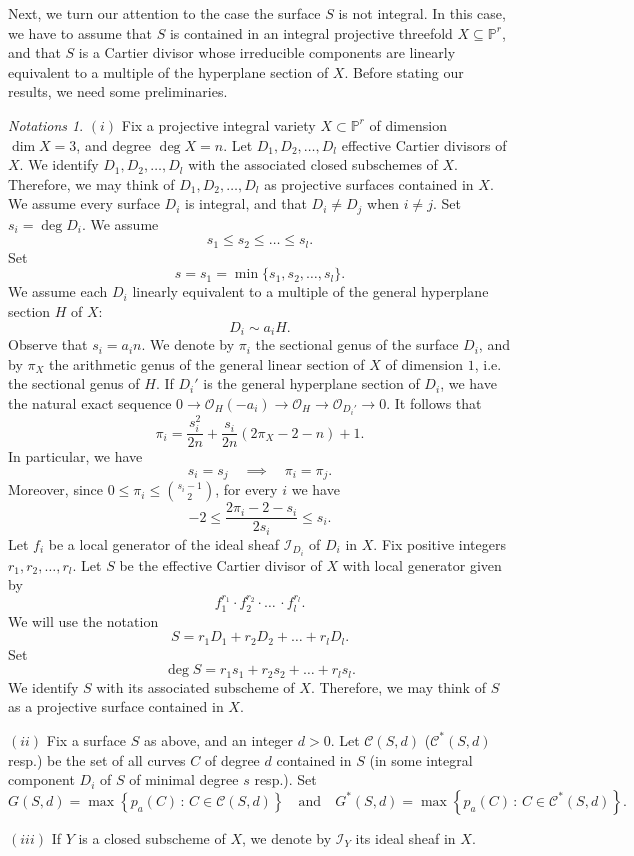 \documentclass[9pt,a4paper]{amsart}
\theoremstyle{plain}
\theoremstyle{definition}
\theoremstyle{remark}
\newtheorem{notations}[theorem]{Notations}
\begin{document}
\bigskip
Next, we turn our attention to the case the surface $S$ is not
integral. In this case, we have to assume that $S$ is contained in an
integral projective threefold $X\subseteq \mathbb P^r$, and that $S$
is a Cartier divisor whose irreducible components are linearly
equivalent to a multiple of the hyperplane section of $X$.
Before stating our results, we need some preliminaries.

\begin{notations}\label{secondnot}
$(i)$ Fix a projective integral variety $X\subset \mathbb P^r$ of
dimension $\dim X=3$, and degree $\deg X=n$. Let $D_1,D_2,\dots,D_l$
effective Cartier divisors of $X$. We identify  $D_1,D_2,\dots,D_l$
with the associated closed subschemes of $X$. Therefore, we may
think of $D_1,D_2,\dots,D_l$ as  projective surfaces contained in
$X$. We assume every surface $D_i$ is integral, and that $D_i\neq
D_j$ when $i\neq j$. Set $s_i=\deg D_i$. We assume
$$
s_1\leq s_2\leq \dots\leq s_l.
$$
Set
$$
s=s_1 =\min\{s_1,s_2,\dots,s_l\}.
$$
We assume each $D_i$ linearly equivalent to a multiple of the
general hyperplane section $H$ of $X$:
\begin{equation}\label{le}
D_i\sim a_iH.
\end{equation}
Observe that $s_i=a_in$. We denote by $\pi_i$ the sectional genus of
the surface $D_i$, and by $\pi_X$ the arithmetic genus of the general
linear section of $X$ of dimension $1$, i.e. the sectional genus of $H$.
If $D_i'$ is the general hyperplane section of $D_i$, we have the natural exact sequence
$0\to \mathcal O_H(-a_i)\to \mathcal O_H\to \mathcal O_{D_i'}\to 0$. It follows that
\begin{equation}\label{Sab2}
\pi_i=\frac{s_i^2}{2n}+\frac{s_i}{2n}(2\pi_X-2-n)+1.
\end{equation}
In particular, we have
$$
s_i=s_j\quad\implies\quad \pi_i=\pi_j.
$$
Moreover, since $0\leq \pi_i\leq \binom {s_i-1}{2}$, for every $i$
we have
\begin{equation}\label{stimapi}
-2\leq \frac{2\pi_i-2-s_i}{2s_i}\leq s_i.
\end{equation}
Let $f_i$ be a local generator of the ideal sheaf $\mathcal I_{D_i}$
of $D_i$ in $X$. Fix positive integers $r_1,r_2,\dots,r_l$. Let $S$
be the effective Cartier divisor of $X$ with local generator given
by
$$
f_1^{r_1}\cdot f_2^{r_2}\cdot\dots\,\cdot f_l^{r_l}.
$$
We will use the notation
$$
S=r_1D_1+ r_2D_2+\dots+ r_lD_l.
$$
Set
$$
\deg S=r_1s_1+ r_2s_2+\dots+ r_ls_l.
$$
We identify $S$ with its associated subscheme of $X$. Therefore, we
may think of $S$ as a projective surface contained in $X$.

\smallskip
$(ii)$ Fix a surface $S$ as above, and an integer $d>0$. Let
$\mathcal C(S,d)$ ($\mathcal C^*(S,d)$ resp.) be the set of all
curves $C$ of degree $d$ contained in $S$ (in some integral
component $D_i$ of $S$ of minimal degree $s$ resp.). Set
$$
G(S,d)=\max\left\{p_a(C)\,:\, C\in \mathcal C(S,d)\right\}\quad
{\text{and}}\quad G^*(S,d)=\max\left\{p_a(C)\,:\, C\in \mathcal
C^*(S,d)\right\}.
$$


\smallskip
$(iii)$ If $Y$ is a closed subscheme of $X$, we denote by $\mathcal
I_Y$ its ideal sheaf in $X$.
\end{notations}
\end{document}
